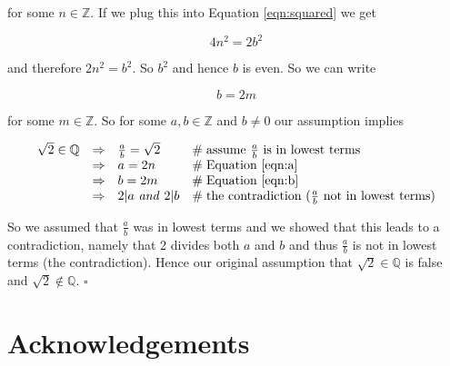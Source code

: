 \documentclass[11pt, oneside]{article}   	%
\theoremstyle{definition}
\begin{document}
\bigskip
\noindent
for some $n \in \mathbb{Z}$. If we plug this into Equation \ref{eqn:squared} we get

\begin{equation*}
4 n^2 = 2 b^2
\end{equation*}

\bigskip
\noindent
and therefore $2n^2 = b^2$. So $b^2$ and hence $b$ is even. So we can write

\begin{equation}
 b = 2 m
 \label{eqn:b}
 \end{equation}

 \bigskip
 \noindent
 for some $m \in \mathbb{Z}$. So for some $a,b \in \mathbb{Z}$ and  $b \neq 0$ our assumption implies


\begin{equation*}
\begin{array}{llll}
\sqrt{2} \in \mathbb{Q} 
&\Rightarrow& \frac{a}{b} = \sqrt{2}                               &\mathrel{\#} \text{assume $\frac{a}{b}$ is in lowest terms} \\
&\Rightarrow& a = 2n                                                     &\mathrel{\#} \text{Equation } \ref{eqn:a} \\
&\Rightarrow& b = 2m                                                  &\mathrel{\#} \text{Equation } \ref{eqn:b} \\
&\Rightarrow& \text{$2|a$ \emph{and} $2|b$}               &\mathrel{\#} \text{the contradiction ($\frac{a}{b}$ not in lowest terms)}
\end{array}
\end{equation*}

\bigskip
\noindent
So we assumed that $\frac{a}{b}$ was in lowest terms and we showed that this leads to a contradiction,  namely that 2 divides both $a$ and $b$
and thus $\frac{a}{b}$ is not in lowest terms (the contradiction). Hence our original assumption that $\sqrt{2} \in \mathbb{Q}$ is false and
$\sqrt{2} \notin \mathbb{Q}$. $\square$

\newpage
\section{Acknowledgements}



\end{document}
